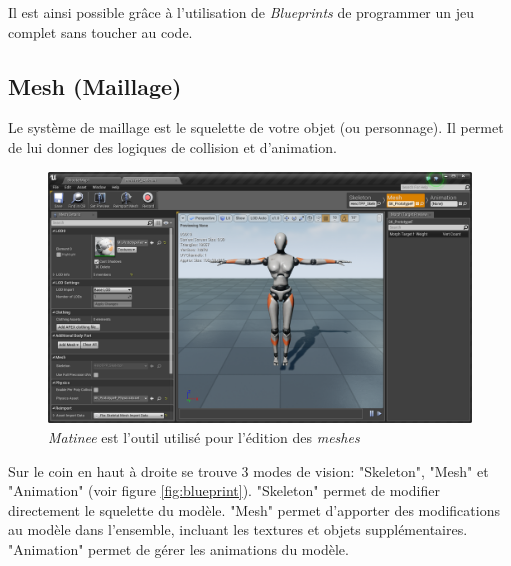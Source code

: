 \documentclass[11pt, a4paper, oneside]{article}
\begin{document}
Il est ainsi possible grâce à l'utilisation de \emph{Blueprints} de programmer un jeu complet sans toucher au code.

\newpage

\subsection{Mesh (Maillage)}
Le système de maillage est le squelette de votre objet (ou personnage). Il permet de lui donner des logiques de collision et d'animation.

\begin{center}
\begin{figure}[htp]
\includegraphics[scale=.47]{mesh}
\caption{\emph{Matinee} est l'outil utilisé pour l'édition des \emph{meshes}}
\label{fig:mesh}
\end{figure}
\end{center}

Sur le coin en haut à droite se trouve 3 modes de vision: "Skeleton", "Mesh" et "Animation" (voir figure \ref{fig:blueprint}). "Skeleton" permet de modifier directement le squelette du modèle. "Mesh" permet d'apporter des modifications au modèle dans l'ensemble, incluant les textures et objets supplémentaires. "Animation" permet de gérer les animations du modèle.

\newpage
\end{document}
